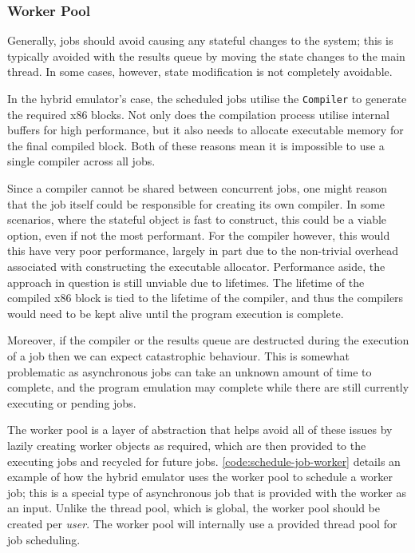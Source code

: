 \subsubsection{Worker Pool}

Generally, jobs should avoid causing any stateful changes to the system; this is typically avoided with the results queue by moving the state changes to the main thread. In some cases, however, state modification is not completely avoidable.

In the hybrid emulator's case, the scheduled jobs utilise the \texttt{Compiler} to generate the required x86 blocks. Not only does the compilation process utilise internal buffers for high performance, but it also needs to allocate executable memory for the final compiled block. Both of these reasons mean it is impossible to use a single compiler across all jobs.

Since a compiler cannot be shared between concurrent jobs, one might reason that the job itself could be responsible for creating its own compiler. In some scenarios, where the stateful object is fast to construct, this could be a viable option, even if not the most performant. For the compiler however, this would this have very poor performance, largely in part due to the non-trivial overhead associated with constructing the executable allocator. Performance aside, the approach in question is still unviable due to lifetimes. The lifetime of the compiled x86 block is tied to the lifetime of the compiler, and thus the compilers would need to be kept alive until the program execution is complete.

Moreover, if the compiler or the results queue are destructed during the execution of a job then we can expect catastrophic behaviour. This is somewhat problematic as asynchronous jobs can take an unknown amount of time to complete, and the program emulation may complete while there are still currently executing or pending jobs.

The worker pool is a layer of abstraction that helps avoid all of these issues by lazily creating worker objects as required, which are then provided to the executing jobs and recycled for future jobs. \autoref{code:schedule-job-worker} details an example of how the hybrid emulator uses the worker pool to schedule a worker job; this is a special type of asynchronous job that is provided with the worker as an input. Unlike the thread pool, which is global, the worker pool should be created per \textit{user}. The worker pool will internally use a provided thread pool for job scheduling.

